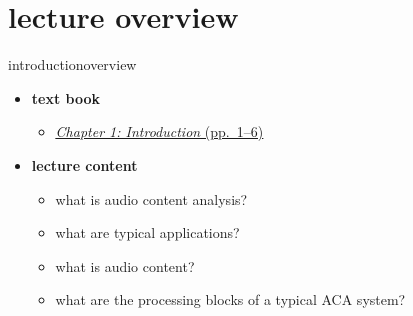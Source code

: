 


\subtitle{Part 2: Introduction}


	

    \section[overview]{lecture overview}
        \begin{frame}{introduction}{overview}
            \begin{itemize}
                \item   \textbf{text book}  
                    \begin{itemize}
                        \item   \href{http://ieeexplore.ieee.org/xpl/articleDetails.jsp?tp=&arnumber=6331118&}{\underline{\textit{Chapter 1: Introduction} (pp.~1--6)}}
                    \end{itemize}
                \bigskip
                \item<2->   \textbf{lecture content}
                    \begin{itemize}
                        \item<2->   what is audio content analysis?
                        \item<3->   what are typical applications?
                        \item<4->   what is audio content?
                        \item<5->   what are the processing blocks of a typical ACA system?
                    \end{itemize}
            \end{itemize}
        \end{frame}
        
